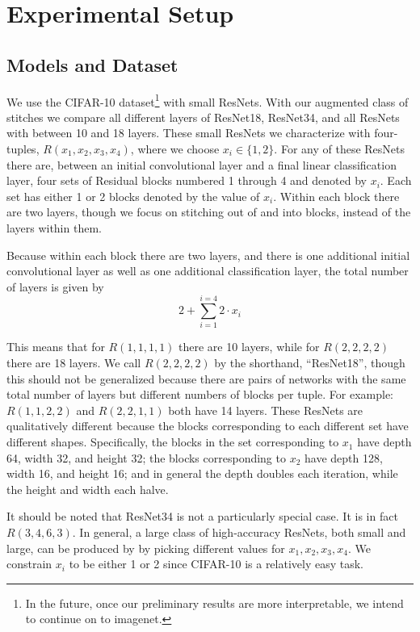 \documentclass{article} %
\begin{document}
\section*{Experimental Setup}
\subsection*{Models and Dataset}
We use the CIFAR-10 dataset\footnote{In the future, once our preliminary results are more interpretable, we intend to
continue on to imagenet.} with small ResNets. With our augmented class of stitches we compare all different
layers of ResNet18, ResNet34, and all
ResNets with between 10 and 18 layers. These small ResNets we characterize with four-tuples,
$R(x_1, x_2, x_3, x_4)$, where we choose $x_i \in \{1, 2\}$. For any of these ResNets there are, between an initial convolutional
layer and a final linear classification layer, four sets of Residual blocks numbered 1 through 4 and denoted by
$x_i$. Each set has either 1 or 2 blocks denoted by the value of $x_i$. Within each block there are two layers,
though we focus on stitching out of and into blocks, instead of the layers within them. 

Because within each block there are two layers, and there is one
additional initial convolutional layer as well as one additional classification layer, the total number
of layers is given by
\[2 + \sum_{i=1}^{i=4} 2 \cdot x_i \]

This means that for $R(1, 1, 1, 1)$ there are 10 layers, while for $R(2, 2, 2, 2)$ there are 18 layers. We call
$R(2, 2, 2, 2)$ by the shorthand, ``ResNet18'', though this should not be generalized because there are pairs
of networks with the same total number of layers but different numbers of blocks per tuple. For example:
$R(1, 1, 2, 2)$ and $R(2, 2, 1, 1)$ both have 14 layers. These ResNets are qualitatively different
because the blocks corresponding to each different set have different shapes. Specifically, the blocks in
the set corresponding to $x_1$ have depth 64, width 32, and height 32; the blocks corresponding to $x_2$ have
depth 128, width 16, and height 16; and in general the depth doubles each iteration,
while the height and width each halve.

It should be noted that ResNet34 is not a particularly special case. It is in fact $R(3, 4, 6, 3)$. In general,
a large class of high-accuracy ResNets, both small and large, can be produced by by picking different values for
$x_1, x_2, x_3, x_4$. We constrain $x_i$ to be either 1 or 2 since CIFAR-10 is a relatively easy task.
\end{document}
